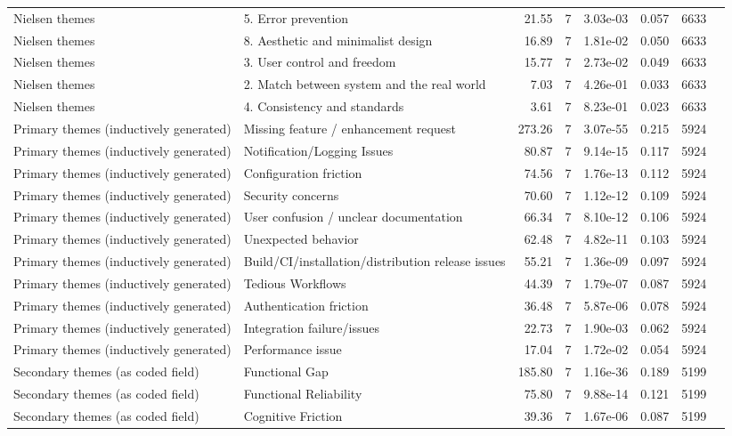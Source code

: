 \begin{table}[t]
\begin{tabular}{llrrrrrr}
Nielsen themes & 5. Error prevention & 21.55 & 7 & 3.03e-03 & 0.057 & 6633 \\
Nielsen themes & 8. Aesthetic and minimalist design & 16.89 & 7 & 1.81e-02 & 0.050 & 6633 \\
Nielsen themes & 3. User control and freedom & 15.77 & 7 & 2.73e-02 & 0.049 & 6633 \\
Nielsen themes & 2. Match between system and the real world & 7.03 & 7 & 4.26e-01 & 0.033 & 6633 \\
Nielsen themes & 4. Consistency and standards & 3.61 & 7 & 8.23e-01 & 0.023 & 6633 \\
Primary themes (inductively generated) & Missing feature / enhancement request & 273.26 & 7 & 3.07e-55 & 0.215 & 5924 \\
Primary themes (inductively generated) & Notification/Logging Issues & 80.87 & 7 & 9.14e-15 & 0.117 & 5924 \\
Primary themes (inductively generated) & Configuration friction & 74.56 & 7 & 1.76e-13 & 0.112 & 5924 \\
Primary themes (inductively generated) & Security concerns & 70.60 & 7 & 1.12e-12 & 0.109 & 5924 \\
Primary themes (inductively generated) & User confusion / unclear documentation & 66.34 & 7 & 8.10e-12 & 0.106 & 5924 \\
Primary themes (inductively generated) & Unexpected behavior & 62.48 & 7 & 4.82e-11 & 0.103 & 5924 \\
Primary themes (inductively generated) & Build/CI/installation/distribution release issues & 55.21 & 7 & 1.36e-09 & 0.097 & 5924 \\
Primary themes (inductively generated) & Tedious Workflows & 44.39 & 7 & 1.79e-07 & 0.087 & 5924 \\
Primary themes (inductively generated) & Authentication friction & 36.48 & 7 & 5.87e-06 & 0.078 & 5924 \\
Primary themes (inductively generated) & Integration failure/issues & 22.73 & 7 & 1.90e-03 & 0.062 & 5924 \\
Primary themes (inductively generated) & Performance issue & 17.04 & 7 & 1.72e-02 & 0.054 & 5924 \\
Secondary themes (as coded field) & Functional Gap & 185.80 & 7 & 1.16e-36 & 0.189 & 5199 \\
Secondary themes (as coded field) & Functional Reliability & 75.80 & 7 & 9.88e-14 & 0.121 & 5199 \\
Secondary themes (as coded field) & Cognitive Friction & 39.36 & 7 & 1.67e-06 & 0.087 & 5199 \\

\end{tabular}
\end{table}

